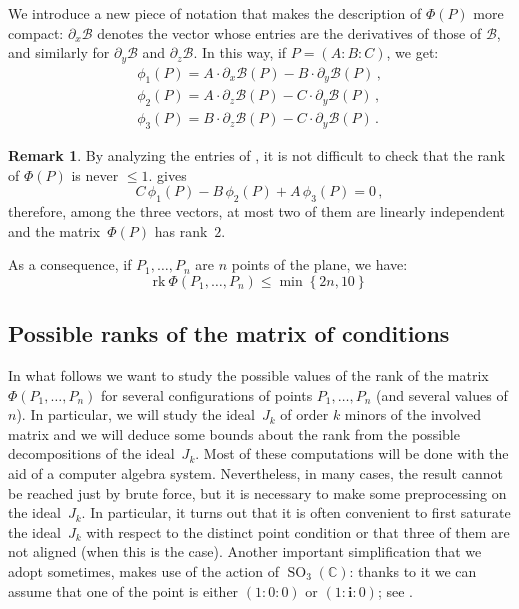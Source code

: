 \documentclass{amsart}
\theoremstyle{plain}
\theoremstyle{definition}
\newtheorem{rmk}[lemma]{Remark}
\newcommand{\C}{\mathbb{C}}
\newcommand{\de}{\partial}
\newcommand{\SO}{\operatorname{SO}}
\newcommand{\iii}{\textbf{i}}
\newcommand{\rk}{\ensuremath{\mathrm{rk}}}
\begin{document}
We introduce a new piece of notation that makes the description of $\Phi(P)$ more compact: $\de_x \mathcal{B}$ denotes the vector whose entries are the derivatives of those of $\mathcal{B}$, and similarly for $\de_y \mathcal{B}$ and $\de_z \mathcal{B}$.
In this way, if $P=(A: B: C)$, we get:
%
\begin{equation}
\label{equation:vector_conditions}
\begin{gathered}
\phi_1(P) = A\cdot \de_x \mathcal{B}(P) - B\cdot \de_y \mathcal{B}(P) \,, \\
\phi_2(P) = A\cdot \de_z \mathcal{B}(P) - C\cdot \de_y \mathcal{B}(P) \,, \\
\phi_3(P) = B\cdot \de_z \mathcal{B}(P) - C\cdot \de_y \mathcal{B}(P) \,.
\end{gathered}
\end{equation}
%
\begin{rmk}
By analyzing the entries of , it is not difficult to check that the rank of $\Phi(P)$ is never $\leq 1$.  gives
\begin{equation}
  C \, \phi_1(P) - B \, \phi_2(P) + A \, \phi_3(P) = 0 \,,
  \label{eq:base}
\end{equation}
therefore,
among the three vectors, at most two of them are linearly independent and the matrix~$\Phi(P)$ has rank~$2$.
\end{rmk}

As a consequence, if $P_1, \dots, P_n$ are $n$ points of the plane, we have:
\begin{equation}
\label{bound_rank}
\rk  \  \Phi(P_1, \dots, P_n) \leq \min \left\{2n, 10 \right\}
\end{equation}

\subsection{Possible ranks of the matrix of conditions}

In what follows we want to study the possible values of the rank of the matrix
$\Phi(P_1, \dots, P_n)$ for several configurations of points $P_1, \dots, P_n$
(and several values of $n$).
In particular, we will study the ideal~$J_k$ of order $k$ minors of the
involved matrix and we will deduce some bounds about the rank from the possible
decompositions of the ideal~$J_k$. Most of these computations will be done
with the aid of a computer algebra system. Nevertheless, in many cases,
the result cannot be reached just by brute force, but it is necessary to
make some preprocessing on the ideal~$J_k$. In particular, it turns out that
it is often convenient to first saturate the ideal~$J_k$ with respect to
the distinct point condition or that three of them are not aligned (when this is the
case). Another important simplification that we adopt sometimes, makes use
of the action of $\SO_3(\C)$: thanks to it we can assume that one of
the point is either $(1: 0: 0)$ or $(1: \iii: 0)$; see .
\end{document}
